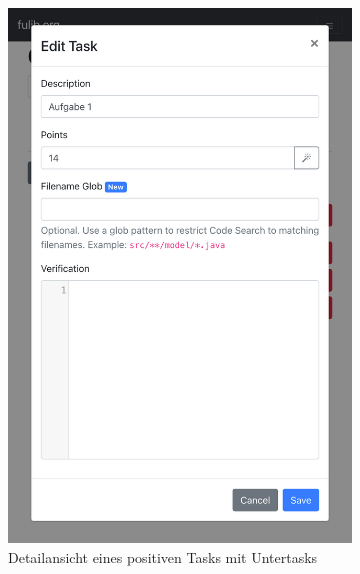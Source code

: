 \begin{figure}
    \centering
    \begin{subfigure}[t]{0.475\textwidth}
        \centering
        \includegraphics[width=\textwidth]{images/assignment-create-tasks-detail-1}
        \caption{Detailansicht eines positiven Tasks mit Untertasks}
        \label{fig:assignment-create-tasks-detail-1}
    \end{subfigure}
    \hfill
    \begin{subfigure}[t]{0.475\textwidth}
        \centering

\end{subfigure}
\end{figure}

